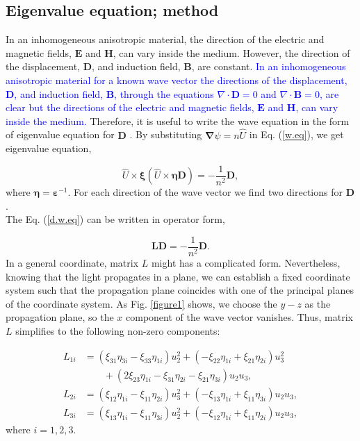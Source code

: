 \documentclass[9pt,twocolumn,twoside]{osajnl}
\begin{document}
\subsection{Eigenvalue equation; method}
In an inhomogeneous anisotropic material, the direction of the electric and magnetic fields, $\mathbf{E}$ and $ \mathbf{H}$,  can vary inside the medium. However, the direction of the displacement, $\mathbf{D}$, and induction field, $\mathbf{B}$, are constant. \textcolor{blue}{In an inhomogeneous anisotropic material for a known wave vector the directions of the displacement, $\mathbf{D}$, and induction field, $\mathbf{B}$, through the equations $\nabla\cdot \mathbf{D} =0 $ and $\nabla\cdot \mathbf{B} =0$, are clear but  the directions of the electric and magnetic fields, $\mathbf{E}$ and $ \mathbf{H}$,  can vary inside the medium.} Therefore, it is useful to write the wave equation in the form of eigenvalue equation for $\mathbf{D}$  \cite{saleh1991fundamentals}. 
By substituting $\boldsymbol{\nabla}{\psi}=n\hat{U}$ in Eq. (\ref{w.eq}), we get eigenvalue equation, 

\begin{equation}\label{d.w.eq}
    \hat{U}\times{\boldsymbol{\xi}(\hat{U}\times\boldsymbol{\eta}\mathbf{D})}=-\frac{1}{n^{2}}\mathbf{D},
\end{equation}
where  $\boldsymbol{\eta}=\boldsymbol{\varepsilon}^{-1}$. For each direction of the wave vector we find  two directions for $\mathbf{D}$.\\
 The Eq. (\ref{d.w.eq}) can be written in operator form,

\begin{equation}\label{m.f}
\mathbf{L}\mathbf{D}=-\frac{1}{n^{2}}\mathbf{D}.        
\end{equation}
In a general coordinate, matrix  $L$ might has a complicated form. Nevertheless, knowing that the light propagates in a plane, we can establish a fixed coordinate system such that the propagation plane coincides with one of the principal planes of the coordinate system. As  Fig. \ref{figure1} shows, we choose the $y-z$ as the propagation plane, so the $x$ component of  the wave vector vanishes.  Thus,  matrix $L$ simplifies to the following non-zero components:

\begin{align}
L_{1i} &= (\xi_{31}\eta_{3i}-\xi_{33}\eta_{1i})u^{2}_{2} +(-\xi_{22}\eta_{1i}+\xi_{21}\eta_{2i})u^{2}_{3}\nonumber\\
&\qquad +(2\xi_{23}\eta_{1i}-\xi_{31}\eta_{2i}-\xi_{21}\eta_{3i})u_{2}u_{3},\nonumber\\
L_{2i} &=(\xi_{12}\eta_{1i}-\xi_{11}\eta_{2i})u^{2}_{3}+(-\xi_{13}\eta_{1i}+\xi_{11}\eta_{3i})u_{2}u_{3}, \nonumber \\
L_{3i} &=(\xi_{13}\eta_{1i}-\xi_{11}\eta_{3i})u^{2}_{2}+(-\xi_{12}\eta_{1i}+\xi_{11}\eta_{2i})u_{2}u_{3},
 \end{align}
where $i=1,2,3$.
\end{document}

